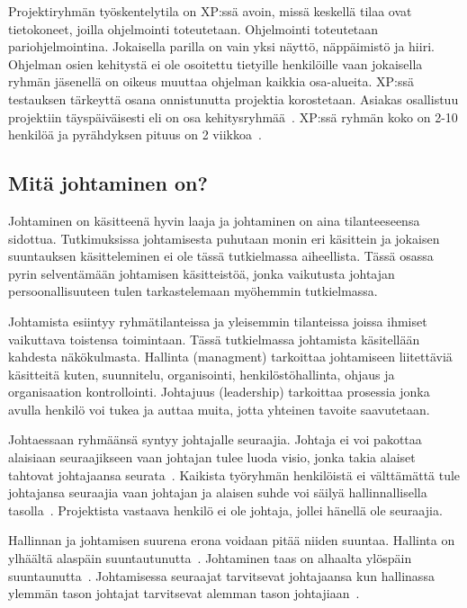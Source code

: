 \documentclass[finnish]{tktltiki2}
\theoremstyle{definition}
\theoremstyle{remark}
\begin{document}
Projektiryhmän työskentelytila on XP:ssä avoin, missä keskellä tilaa ovat tietokoneet, joilla ohjelmointi toteutetaan. Ohjelmointi toteutetaan pariohjelmointina. Jokaisella parilla on vain yksi näyttö, näppäimistö ja hiiri. Ohjelman osien kehitystä ei ole osoitettu tietyille henkilöille vaan jokaisella ryhmän jäsenellä on oikeus muuttaa ohjelman kaikkia osa-alueita. XP:ssä testauksen tärkeyttä osana onnistunutta projektia korostetaan. Asiakas osallistuu projektiin täyspäiväisesti eli on osa kehitysryhmää~\cite{796139}. XP:ssä ryhmän koko on 2-10 henkilöä ja pyrähdyksen pituus on 2 viikkoa~\cite{cohen2004introduction}. 

\subsection{Mitä johtaminen on?}

Johtaminen on käsitteenä hyvin laaja ja johtaminen on aina tilanteeseensa sidottua. Tutkimuksissa johtamisesta puhutaan monin eri käsittein ja jokaisen suuntauksen käsitteleminen ei ole tässä tutkielmassa aiheellista. Tässä osassa pyrin selventämään johtamisen käsitteistöä, jonka vaikutusta johtajan persoonallisuuteen tulen tarkastelemaan myöhemmin tutkielmassa. 

Johtamista esiintyy ryhmätilanteissa ja yleisemmin tilanteissa joissa ihmiset vaikuttava toistensa toimintaan. Tässä tutkielmassa johtamista käsitellään kahdesta näkökulmasta. Hallinta (managment) tarkoittaa johtamiseen liitettäviä käsitteitä kuten, suunnitelu, organisointi, henkilöstöhallinta, ohjaus ja organisaation kontrollointi. Johtajuus (leadership) tarkoittaa prosessia jonka avulla henkilö voi tukea ja auttaa muita, jotta yhteinen tavoite saavutetaan.

Johtaessaan ryhmäänsä syntyy johtajalle seuraajia. Johtaja ei voi pakottaa alaisiaan seuraajikseen vaan johtajan tulee luoda visio, jonka takia alaiset tahtovat johtajaansa seurata~\cite{raccoon2006leadership}. Kaikista työryhmän henkilöistä ei välttämättä tule johtajansa seuraajia vaan johtajan ja alaisen suhde voi säilyä hallinnallisella tasolla~\cite{raccoon2006leadership}. Projektista vastaava henkilö ei ole johtaja, jollei hänellä ole seuraajia. 

Hallinnan ja johtamisen suurena erona voidaan pitää niiden suuntaa. Hallinta on ylhäältä alaspäin suuntautunutta~\cite{raccoon2006leadership}. Johtaminen taas on alhaalta ylöspäin suuntaunutta~\cite{raccoon2006leadership}. Johtamisessa seuraajat tarvitsevat johtajaansa kun hallinassa ylemmän tason johtajat tarvitsevat alemman tason johtajiaan~\cite{raccoon2006leadership}.  
\end{document}
